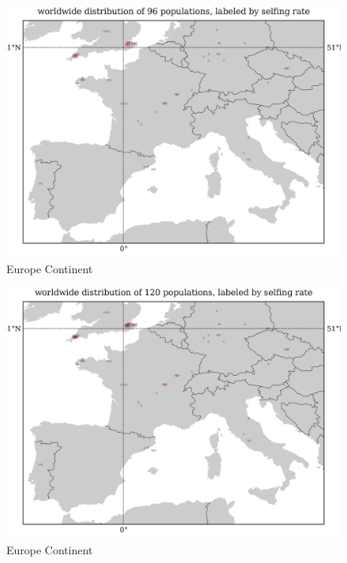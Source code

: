 \documentclass[a4paper,10pt]{article}
\begin{document}
\begin{figure}
\includegraphics[width=1\textwidth]{figures/s0829popid2ecotypeid_10_EurCont__10_35_20_53_l3y1_pop_map.png}
\caption{Europe Continent}\label{f14}
\end{figure}

\begin{figure}
\includegraphics[width=1\textwidth]{figures/s0829popid2ecotypeid_5_EurCont__10_35_20_53_l3y1_pop_map.png}
\caption{Europe Continent}\label{f13}
\end{figure}
\end{document}
